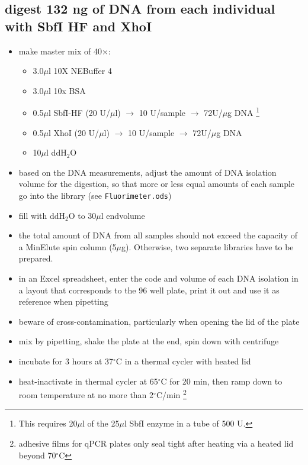 \subsection
{digest 132 ng of DNA from each individual with SbfI HF and XhoI}
\begin{itemize}
\item make master mix of 40$\times$:
	\begin{itemize}
	\item 3.0$\mu$l 10X NEBuffer 4
	\item 3.0$\mu$l 10x BSA 
	\item 0.5$\mu$l SbfI-HF (20 U/$\mu$l) $\rightarrow$ 10 U/sample $\rightarrow$ 72U/$\mu$g DNA \footnote{This requires 20$\mu$l of the 25$\mu$l SbfI enzyme in a tube of 500 U.}
	\item 0.5$\mu$l XhoI (20 U/$\mu$l) $\rightarrow$ 10 U/sample $\rightarrow$ 72U/$\mu$g DNA
	\item 10$\mu$l ddH$_{2}$O
	\end{itemize}
\item based on the DNA measurements, adjust the amount of DNA isolation volume for the digestion, so that more or less equal amounts of each sample go into the library (see \texttt{Fluorimeter.ods})
\item fill with ddH$_{2}$O to 30$\mu$l endvolume
\item the total amount of DNA from all samples should not exceed the capacity of a MinElute spin column (5$\mu$g). Otherwise, two separate libraries have to be prepared.
\item in an Excel spreadsheet, enter the code and volume of each DNA isolation in a layout that corresponds to the 96 well plate, print it out and use it as reference when pipetting
\item beware of cross-contamination, particularly when opening the lid of the plate
\item mix by pipetting, shake the plate at the end, spin down with centrifuge
\item incubate for 3 hours at 37$^{\circ}$C in a thermal cycler with heated lid
\item heat-inactivate in thermal cycler at 65$^{\circ}$C for 20 min, then ramp down to room temperature at no more than 2$^{\circ}$C/min \footnote{adhesive films for qPCR plates only seal tight after heating via a heated lid beyond 70$^{\circ}$C}
\end{itemize}

